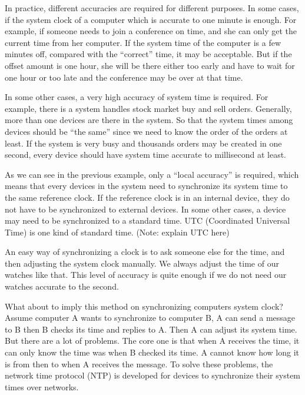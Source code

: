 In practice, different accuracies are required for different purposes. 
In some cases, if the system clock of a computer which is accurate to one
minute is enough. For example, if someone needs to join a conference on time,
and she can only get the current time from her computer. If the system time
of the computer is a few minutes off, compared with the ``correct'' time, it
may be acceptable. But if the offset amount is one hour, she will be there
either too early and have to wait for one hour or too late and the conference
may be over at that
time.

In some other cases, a very high accuracy of system time is required. For
example, there is a system handles stock market buy and sell orders. Generally,
more than one devices are there in the system. So that the system times among
devices should be ``the same'' since we need to know the order of the orders at
least. If the system is very busy and thousands orders may be created in one
second, every device should have system time accurate to millisecond at least.

As we can see in the previous example, only a ``local accuracy'' is required,
which means that every devices in the system need to synchronize its system
time to the same reference clock. If the reference clock is in an internal
device, they do not have to be synchronized to external devices. In some other
cases, a device may need to be synchronized to a standard time. 
UTC (Coordinated Universal Time) is one kind of standard time. 
(Note: explain UTC here)

An easy way of synchronizing a clock is to ask someone else for the time, and
then adjusting the system clock manually. We always adjust the time of our
watches like that. This level of  accuracy is quite enough if we do not need
our watches accurate to the second. 

What about to imply this method on synchronizing computers system clock? Assume
computer A wants to synchronize to computer B, A can send a message to B then B
checks its time and replies to A\null. Then A can adjust its system time.  
But there are a lot of problems.  The core one is that when A receives
the time, it can only know the time was when B checked its time. A cannot know
how long it is from then to when A receives the message. To solve these
problems, the network time protocol (NTP) is developed for devices to
synchronize their system times over networks. 

